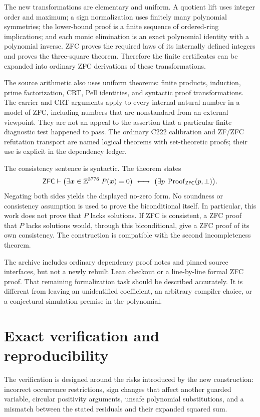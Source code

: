 \documentclass[11pt,letterpaper]{article}
\theoremstyle{definition}
\newcommand{\Z}{\mathbb Z}
\newcommand{\ZFC}{\mathsf{ZFC}}
\begin{document}
The new transformations are elementary and uniform. A quotient lift
uses integer order and maximum; a sign normalization uses finitely
many polynomial symmetries; the lower-bound proof is a finite sequence
of ordered-ring implications; and each monic elimination is an exact
polynomial identity with a polynomial inverse. ZFC proves the
required laws of its internally defined integers and proves the
three-square theorem. Therefore the finite certificates can be
expanded into ordinary ZFC derivations of these transformations.

The source arithmetic also uses uniform theorems: finite products,
induction, prime factorization, CRT, Pell identities, and syntactic
proof transformations. The carrier and CRT arguments apply to every
internal natural number in a model of ZFC, including numbers that
are nonstandard from an external viewpoint. They are not an appeal to
the assertion that a particular finite diagnostic test happened to pass.
The ordinary C222 calibration and ZF/ZFC refutation transport are
named logical theorems with set-theoretic proofs; their use is
explicit in the dependency ledger.

The consistency sentence is syntactic. The theorem states
\[
\ZFC\vdash
\bigl(\exists\boldsymbol x\in\Z^{\MainVars}\;P(\boldsymbol x)=0\bigr)
\ \longleftrightarrow\
\bigl(\exists p\;\operatorname{Proof}_{\ZFC}(p,\bot)\bigr).
\]
Negating both sides yields the displayed no-zero form. No soundness or
consistency assumption is used to prove the biconditional itself.
In particular, this work does not prove that $P$ lacks solutions.
If ZFC is consistent, a ZFC proof that $P$ lacks solutions would,
through this biconditional, give a ZFC proof of its own consistency.
The construction is compatible with the second incompleteness theorem.

The archive includes ordinary dependency proof notes and pinned source
interfaces, but not a newly rebuilt Lean checkout or a line-by-line
formal ZFC proof. That remaining formalization task should be described
accurately. It is different from leaving an unidentified coefficient,
an arbitrary compiler choice, or a conjectural simulation premise in
the polynomial.

\section{Exact verification and reproducibility}
\label{sec:verification}

The verification is designed around the risks introduced by the new
construction: incorrect occurrence restrictions, sign changes that
affect another guarded variable, circular positivity arguments,
unsafe polynomial substitutions, and a mismatch between the stated
residuals and their expanded squared sum.
\end{document}
